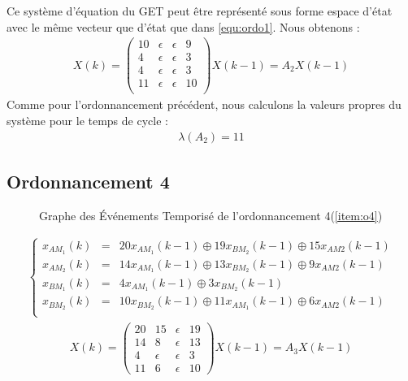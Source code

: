 Ce système d'équation du GET peut être représenté sous forme espace d'état avec le même vecteur que d'état que dans \ref{equ:ordo1}. Nous obtenons :
\begin{align}\label{eqn:eeOrdo3}
X(k) = \begin{pmatrix}
10 & \epsilon &\epsilon & 9\\
4 &\epsilon &\epsilon & 3\\
4 &\epsilon &\epsilon & 3\\
11 &\epsilon &\epsilon & 10\\
\end{pmatrix}X(k-1) = A_2X(k-1)
\end{align} 
Comme pour l'ordonnancement précédent, nous calculons la valeurs propres du système pour le temps de cycle : 
\begin{eqnarray*}
\lambda(A_2) = 11  
\end{eqnarray*}

\subsection{Ordonnancement 4}
\begin{figure}[!ht]
\centering
\caption{\label{fig:get} Graphe des Événements Temporisé de l'ordonnancement 4(\ref{item:o4})}
\end{figure}
\begin{align*}%
\left\lbrace
\begin{array}{lcl}
x_{AM_1}(k)&=& 20x_{AM_1}(k-1) \oplus 19x_{BM_2}(k-1) \oplus 15x_{AM2}(k-1)\\
x_{AM_2}(k)&=& 14x_{AM_1}(k-1) \oplus 13x_{BM_2}(k-1) \oplus  9x_{AM2}(k-1)\\
x_{BM_1}(k)&=&  4x_{AM_1}(k-1) \oplus  3x_{BM_2}(k-1)\\
x_{BM_2}(k)&=& 10x_{BM_2}(k-1) \oplus 11x_{AM_1}(k-1) \oplus  6x_{AM2}(k-1)\\
\end{array}
\right.
\end{align*}
\begin{align}\label{eqn::ee_Ordo4}
X(k) = \begin{pmatrix}
20&15&\epsilon&19\\
14&8&\epsilon&13\\
4&\epsilon&\epsilon&3\\
11&6&\epsilon&10
\end{pmatrix}X(k-1) = A_3X(k-1)
\end{align}
